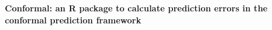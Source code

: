 \documentclass[a4paper]{book}
\begin{document}
\chapter*{}
\begin{center}
{\textbf{\huge Conformal: an R package to calculate prediction errors in the conformal prediction framework}}
\par\bigskip{\large \today}
\end{center}
\end{document}
